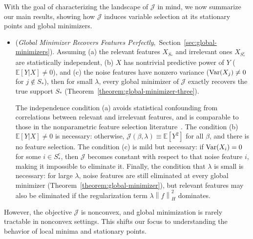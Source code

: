 \documentclass[sn-mathphys-num]{sn-jnl}%
\numberwithin{equation}{section}
\newcommand{\redblock}[1]{{\color{black}#1}}
\newcommand{\E}{\mathbb{E}}
\newcommand{\norm}[1]{\left\|{#1}\right\|} %
\newcommand{\Var}{{\rm Var}}
\theoremstyle{thmstyleone}%
\theoremstyle{thmstyletwo}%
\theoremstyle{thmstylethree}%
\begin{document}
With the goal of characterizing the landscape of $\mathcal{J}$ in mind, we now summarize our main results, showing how $\mathcal{J}$ induces variable selection at its stationary points and global minimizers. %


\redblock{
\vspace{.5em}
\begin{itemize}
\item (\emph{Global Minimizer Recovers Features Perfectly},~Section~\ref{sec:global-minimizers}). 
Assuming (a) the relevant features $X_{S_*}$ and irrelevant ones $X_{S_*^c}$ are statistically independent, (b) $X$ has nontrivial predictive power of $Y$ ($\E[Y|X] \neq 0$), and (c) the noise features have nonzero variance ($\Var(X_j) \neq 0$ for $j \notin S_*$), then for small $\lambda$, every global minimizer of $\mathcal{J}$ exactly recovers the true support $S_*$ (Theorem~\ref{theorem:global-minimizer-three}).  %

The independence condition (a) avoids statistical confounding from correlations between relevant and irrelevant features, and is comparable to those in the nonparametric feature selection literature~\cite{LaffertyWasserman08, CommingesDa12, CandesFaJaLv18}. The condition (b) $\E[Y|X] \neq 0$ is necessary: otherwise, $\mathcal{J}(\beta, \lambda) \equiv \E[Y^2]$ for all $\beta$, and there is no feature selection. The condition (c) is mild but necessary: if $\Var(X_i) = 0$ for some $i \in S_*^c$, then $\mathcal{J}$ becomes constant with respect to that noise feature $i$, making it impossible to eliminate it. Finally, the condition that $\lambda$ is small is necessary: for large $\lambda$, noise features are still eliminated at every global minimizer (Theorem~\ref{theorem:global-minimizer}), but relevant features may also be eliminated if the regularization term $\lambda \norm{f}_H^2$ dominates.
\end{itemize}
}
\vspace{.5em}
However, the objective $\mathcal{J}$ is nonconvex, and global minimization is rarely tractable in nonconvex settings.  This shifts 
our focus to understanding the behavior of local minima and stationary points.
\end{document}
